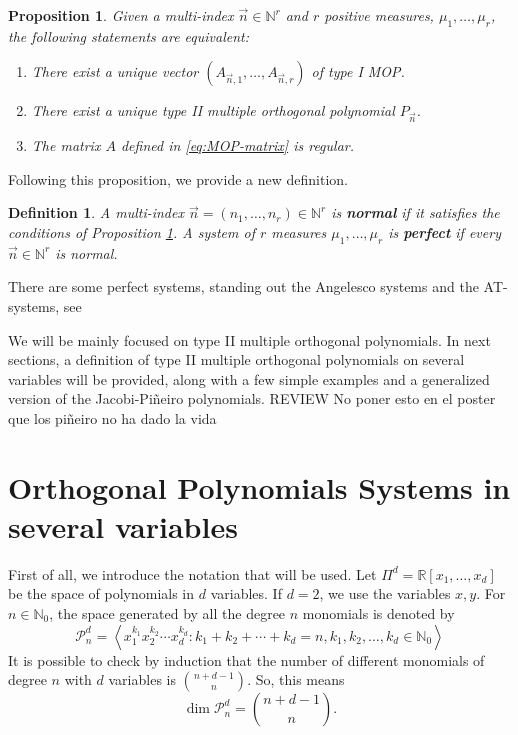 \documentclass[12pt,a4]{article}
\theoremstyle{plain}
\newtheorem{proposition}[theorem]{Proposition}
\newtheorem{definition}[theorem]{Definition}
\newcommand{\R}[0]{\mathbb{R}}
\newcommand{\N}[0]{\mathbb{N}}
\newcommand{\cred}[1]{{\color{red} #1}}
\begin{document}
\begin{proposition}
    \label{prop:existence-of-MOP}
    Given a multi-index $\vec n\in\N^r$ and $r$ positive measures, $\mu_1,\dots,\mu_r$, the following statements are equivalent:
    \begin{enumerate}
        \item There exist a unique vector $(A_{\vec n,1}, \dots, A_{\vec n,r})$ of type I MOP.
        \item There exist a unique type II multiple orthogonal polynomial $P_{\vec n}$.
        \item The matrix $A$ defined in \eqref{eq:MOP-matrix} is regular.
    \end{enumerate}
\end{proposition}

Following this proposition, we provide a new definition.

\begin{definition}
    A multi-index $\vec n = (n_1,\dots,n_r)\in\N^r$ is \textbf{normal} if it satisfies the conditions of Proposition \ref{prop:existence-of-MOP}.
    A system of $r$ measures $\mu_1,\dots,\mu_r$ is \textbf{perfect} if every $\vec n\in\N^r$ is normal.
\end{definition}

There are some perfect systems, standing out the Angelesco systems and the AT-systems, see \cite[Sections 23.1.1 and 23.1.2]{Ismail}

We will be mainly focused on type II multiple orthogonal polynomials. In next sections, a definition of type II multiple orthogonal polynomials on several variables will be provided, along with a few simple examples and a generalized version of the Jacobi-Piñeiro polynomials. 
\cred{REVIEW No poner esto en el poster que los piñeiro no ha dado la vida}

\section{Orthogonal Polynomials Systems in several variables}

First of all, we introduce the notation that will be used. Let $\Pi^d=\R[x_1,\dots,x_d]$ be the space of polynomials in $d$ variables. If $d=2$, we use the variables $x,y$. For $n\in\N_0$, the space generated by all the degree $n$ monomials is denoted by 
$$
\mathcal{P}_n^d = \left\langle x_1^{k_1} x_2^{k_2} \cdots x_d^{k_d}: k_1+k_2+\cdots +k_d = n, k_1,k_2,\dots,k_d\in\N_0\right\rangle
$$
It is possible to check by induction that the number of different monomials of degree $n$ with $d$ variables is $\displaystyle\binom{n+d-1}{n}$. So, this means
$$
\dim \mathcal{P}_n^d = \binom{n+d-1}{n}.
$$
\end{document}
